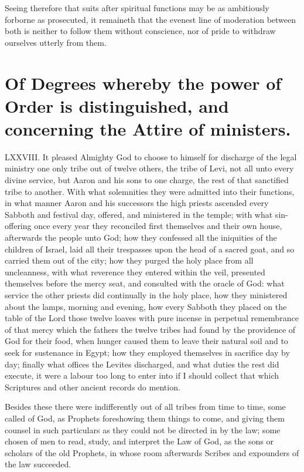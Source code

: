 Seeing therefore that suits after spiritual functions may be as ambitiously forborne as prosecuted, it remaineth that the evenest line of moderation between both is neither to follow them without conscience, nor of pride to withdraw ourselves utterly from them.


\section*{Of Degrees whereby the power of Order is distinguished, and concerning the Attire of ministers.}
LXXVIII. It pleased Almighty God to choose to himself for discharge of the legal ministry one only tribe out of twelve others, the tribe of Levi, not all unto every divine service, but Aaron and his sons to one charge, the rest of that sanctified tribe to another. With what solemnities they were admitted into their functions, in what manner Aaron and his successors the high priests ascended every Sabboth and festival day, offered, and ministered in the temple; with what sin-offering once every year they reconciled first themselves and their own house, afterwards the people unto God; how they confessed all the iniquities of the children of Israel, laid all their trespasses upon the head of a sacred goat, and so carried them out of the city; how they purged the holy place from all uncleanness, with what reverence they entered within the veil, presented themselves before the mercy seat, and consulted with the oracle of God: what service the other priests did continually in the holy place, how they ministered about the lamps, morning and evening, how every Sabboth they placed on the table of the Lord those twelve loaves with pure incense in perpetual remembrance of that mercy which the fathers the twelve tribes had found by the providence of God for their food, when hunger caused them to leave their natural soil and to seek for sustenance in Egypt; how they employed themselves in sacrifice day by day; finally what offices the Levites discharged, and what duties the rest did execute, it were a  labour too long to enter into if I should collect that which Scriptures and other ancient records do mention.

Besides these there were indifferently out of all tribes from time to time, some called of God, as Prophets foreshowing them things to come, and giving them counsel in such particulars as they could not be directed in by the law; some chosen of men to read, study, and interpret the Law of God, as the sons or scholars of the old Prophets, in whose room afterwards Scribes and expounders of the law succeeded.

